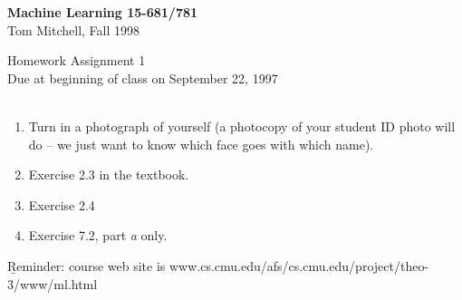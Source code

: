 

\oddsidemargin 0cm      %
\evensidemargin 0cm
\textwidth 16.5cm



\newcommand{\bi}{\begin{itemize}}
\newcommand{\ei}{\end{itemize}}
\newcommand{\be}{\begin{enumerate}}
\newcommand{\ee}{\end{enumerate}}
\newcommand{\tand}{\wedge}
\newcommand{\tor}{\vee}
\newcommand{\union}{\cup}
\newcommand{\intersection}{\cap}
\newcommand{\ch}{$\surd$}
\newcommand{\pgm}[1]{{\sc #1}}
\newcommand{\la}{\leftarrow}
\newcommand{\ra}{\rightarrow}


\begin{center}
\large
{\bf Machine Learning 15-681/781}\\
Tom Mitchell, Fall 1998
\end{center}

\begin{center}
\large  Homework Assignment 1\\
Due at beginning of class on September 22, 1997 \\
\ \\

\end{center}

\be
\item Turn in a photograph of yourself (a photocopy of your student ID photo
will do --  we just want to know which face goes with which name). 
\item Exercise 2.3 in the textbook.
\item Exercise 2.4
\item Exercise 7.2, part {\em a} only.
\ee

\vspace*{1.5in}
\centerline{\b Reminder: course web site is www.cs.cmu.edu/afs/cs.cmu.edu/project/theo-3/www/ml.html}

